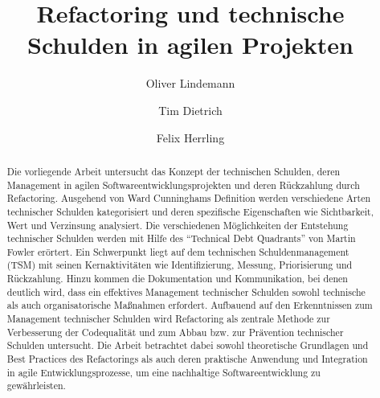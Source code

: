 \documentclass[acmtog]{acmart}
\begin{document}
\lstset{language=Java}

\title{Refactoring und technische Schulden in agilen Projekten}

\author{Oliver Lindemann}
\author{Tim Dietrich}
\authornotemark[1]
\author{Felix Herrling}
\authornotemark[1]
\renewcommand{\shortauthors}{Lindemann, Dietrich und Herrling}

\begin{abstract}

  Die vorliegende Arbeit untersucht das Konzept der technischen Schulden, deren
  Management in agilen Softwareentwicklungsprojekten und deren Rückzahlung durch
  Refactoring. Ausgehend von Ward Cunninghams Definition werden verschiedene Arten
  technischer Schulden kategorisiert und deren spezifische Eigenschaften wie Sichtbarkeit,
  Wert und Verzinsung analysiert. Die verschiedenen Möglichkeiten der Entstehung
  technischer Schulden werden mit Hilfe des “Technical Debt Quadrants” von Martin
  Fowler erörtert. Ein Schwerpunkt liegt auf dem technischen Schuldenmanagement (TSM)
  mit seinen Kernaktivitäten wie Identifizierung, Messung, Priorisierung und Rückzahlung.
  Hinzu kommen die Dokumentation und Kommunikation, bei denen deutlich wird, dass
  ein effektives Management technischer Schulden sowohl technische als auch
  organisatorische Maßnahmen erfordert. Aufbauend auf den Erkenntnissen zum Management
  technischer Schulden wird Refactoring als zentrale Methode zur Verbesserung der
  Codequalität und zum Abbau bzw. zur Prävention technischer Schulden untersucht.
  Die Arbeit betrachtet dabei sowohl theoretische Grundlagen und Best Practices des
  Refactorings als auch deren praktische Anwendung und Integration in agile
  Entwicklungsprozesse, um eine nachhaltige Softwareentwicklung zu gewährleisten.

\end{abstract}
\end{document}
